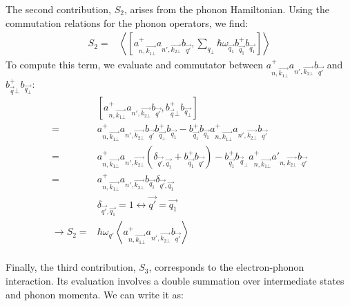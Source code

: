 \documentclass{article}
\begin{document}
The second contribution, $S_2$, arises from the phonon Hamiltonian. Using the commutation relations for the phonon operators, we find:
\begin{align*}
        S_2 = & \left \langle \left[a^+_{n,\vec{k_{1\bot}}}a_{n',\vec{k_{2\bot}}}b_{\vec{q'}}, \sum_{q_\bot} \hbar \omega_{\vec{q_1}} b^+_{\vec{q_1}} b_{\vec{q_1}}\right] \right \rangle
\end{align*}
To compute this term, we evaluate and commutator between $a^+_{n,\vec{k_{1\bot}}}a_{n',\vec{k_{2\bot}}}b_{\vec{q'}}$ and $b^+_{\vec{q}\bot} b_{\vec{q_{\bot}}}$:
\begin{align*}
    & \left[a^+_{n,\vec{k_{1\bot}}}a_{n',\vec{k_{2\bot}}}b_{\vec{q'}},b^+_{\vec{q}\bot} b_{\vec{q_{\bot}}}\right] \\
    =& a^+_{n, \vec{k_{1\bot}}}a_{n',\vec{k_{2\bot}}}b_{\vec{q'}}b^+_{\vec{q_\bot}}b_{\vec{q_1}} -b^+_{\vec{q_1}}b_{\vec{q_1}}a^+_{n,\vec{k_{1\bot}}}a_{n', \vec{k_{2\bot}}}b_{\vec{q'}}\\
    = & a^+_{n, \vec{k_{1\bot}}} a_{n', \vec{k_{2\bot}}} \left(\delta_{\vec{q'},\vec{q_1}}+ b^+_{\vec{q_1}}b_{\vec{q'}}\right)-b^+_{\vec{q_1}}b_{\vec{q}_{\bot}} a^+_{n, \vec{k_{1\bot}}} a'_{n, \vec{k_{2\bot}}}b_{\vec{q'}} \\
    = & a^+_{n, \vec{k_{1\bot}}}a_{n', \vec{k_{2\bot}}}b_{\vec{q_1}}\delta_{\vec{q'}, \vec{q_1}} \\
    & \delta_{\vec{q'}, \vec{q_1}} = 1 \leftrightarrow \vec{q'} = \vec{q_1} \\
    \rightarrow S_2 = & \hbar \omega_{q'} \left \langle a^+_{n, \vec{k_{1\bot}}}a_{n', \vec{k_{2\bot}}}b_{\vec{q'}}\right \rangle \\
\end{align*}

Finally, the third contribution, $S_3$, corresponds to the electron-phonon interaction. Its evaluation involves a double summation over intermediate states and phonon momenta. We can write it as:
\end{document}
